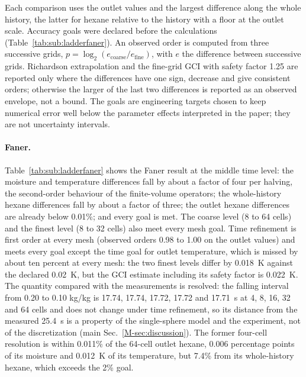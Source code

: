 \documentclass[11pt]{article}
\begin{document}
Each comparison uses the outlet values and the largest difference along
the whole history, the latter for hexane relative to the history with a
floor at the outlet scale. Accuracy goals were declared before the
calculations (Table~\ref{tab:sub:ladderfaner}). An observed order is
computed from three successive grids, $p=\log_2(e_{\mathrm{coarse}}/e_{\mathrm{fine}})$,
with $e$ the difference between successive grids. Richardson extrapolation
and the fine-grid GCI with safety factor 1.25 \citep{roache1998verification}
are reported only where the differences have one sign, decrease and give
consistent orders; otherwise the larger of the last two differences is
reported as an observed envelope, not a bound. The goals are engineering
targets chosen to keep numerical error well below the parameter effects
interpreted in the paper; they are not uncertainty intervals.

\paragraph{Faner.}
Table~\ref{tab:sub:ladderfaner} shows the Faner result at the middle time
level: the moisture and temperature differences fall by about a factor of
four per halving, the second-order behaviour of the finite-volume
operators; the whole-history hexane differences fall by about a factor of
three; the outlet hexane differences are already below 0.01\%; and every
goal is met. The coarse level (8 to 64 cells) and the finest level (8 to 32 cells)
also meet every mesh goal. Time refinement is first order at every mesh (observed orders
0.98 to 1.00 on the outlet values) and meets every goal except the
time goal for outlet temperature, which is missed by about ten percent at
every mesh: the two finest levels differ by 0.018~K against the declared
0.02~K, but the GCI estimate including its safety factor is 0.022~K.
The quantity compared with the measurements is resolved: the falling
interval from 0.20 to 0.10 kg/kg is 17.74, 17.74, 17.72, 17.72 and
17.71~s at 4, 8, 16, 32 and 64 cells and does not change under time
refinement, so its distance from the measured 25.4~s is a property of the
single-sphere model and the experiment, not of the discretization (main
Sec.~\ref*{M-sec:discussion}). The former four-cell resolution is within
0.011\% of the 64-cell outlet hexane, 0.006 percentage points of its
moisture and 0.012~K of its temperature, but 7.4\% from its whole-history
hexane, which exceeds the 2\% goal.
\end{document}

